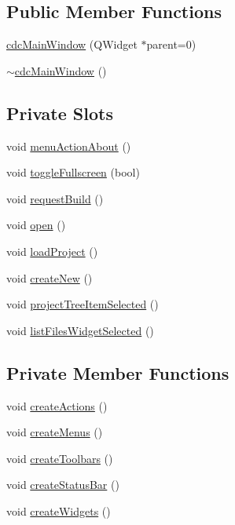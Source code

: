 \subsection*{Public Member Functions}
\begin{DoxyCompactItemize}
\item 
\hyperlink{classcdc_main_window_a152934d912eba5b8d46ffc909705e753}{cdc\+Main\+Window} (Q\+Widget $\ast$parent=0)
\item 
\hyperlink{classcdc_main_window_afc27c52a07905eb44b90265ccb716bc4}{$\sim$cdc\+Main\+Window} ()
\end{DoxyCompactItemize}
\subsection*{Private Slots}
\begin{DoxyCompactItemize}
\item 
void \hyperlink{classcdc_main_window_aae83c9e69786db44cddbedc869e778ee}{menu\+Action\+About} ()
\item 
void \hyperlink{classcdc_main_window_a4c5cd1095df7a9c7b81d492f8584cc7c}{toggle\+Fullscreen} (bool)
\item 
void \hyperlink{classcdc_main_window_a3bfb1c19a7c341ec29209ce671a31244}{request\+Build} ()
\item 
void \hyperlink{classcdc_main_window_a788d8721e83a4bdfb7f29364f43c2664}{open} ()
\item 
void \hyperlink{classcdc_main_window_a270552b000c6e8142dfa58d24621b571}{load\+Project} ()
\item 
void \hyperlink{classcdc_main_window_a9922f5b1de24ca399aa8ad18758e9339}{create\+New} ()
\item 
void \hyperlink{classcdc_main_window_ac03dde5c25ceda203773aabb84bc24ef}{project\+Tree\+Item\+Selected} ()
\item 
void \hyperlink{classcdc_main_window_a95ba6457d858d22fc15246a6f1deaf71}{list\+Files\+Widget\+Selected} ()
\end{DoxyCompactItemize}
\subsection*{Private Member Functions}
\begin{DoxyCompactItemize}
\item 
void \hyperlink{classcdc_main_window_a6da58a8decd1c57d5b61a318baff0894}{create\+Actions} ()
\item 
void \hyperlink{classcdc_main_window_ae4951ac1c365e34d3182cca170e1bf9f}{create\+Menus} ()
\item 
void \hyperlink{classcdc_main_window_a1e637d866cb42165fb7f27c92d40f5e0}{create\+Toolbars} ()
\item 
void \hyperlink{classcdc_main_window_a15906e7ebff4d21e4b4e35774458e99e}{create\+Status\+Bar} ()
\item 
void \hyperlink{classcdc_main_window_a14699c304214e6939300e2a9945e9bbe}{create\+Widgets} ()
\end{DoxyCompactItemize}
